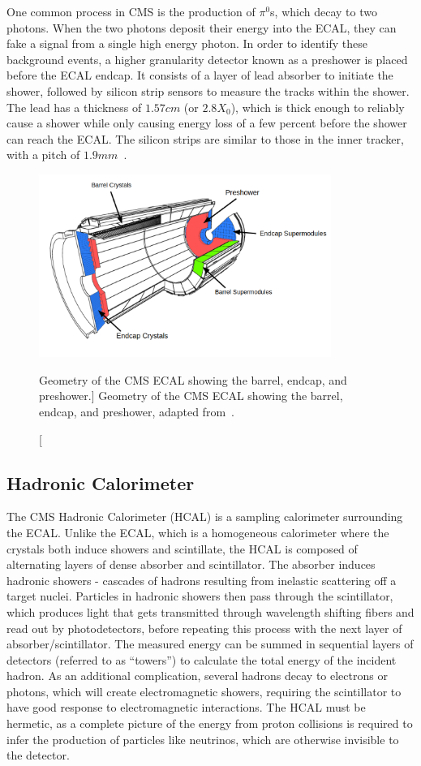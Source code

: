 One common process in CMS is the production of $\pi^0$s, which decay to two photons. When the two photons deposit their energy into the ECAL, they can fake a signal from a single high energy photon. In order to identify these background events, a higher granularity detector known as a preshower is placed before the ECAL endcap. It consists of a layer of lead absorber to initiate the shower, followed by silicon strip sensors to measure the tracks within the shower. The lead has a thickness of $1.57\unit{cm}$ (or $2.8X_0$), which is thick enough to reliably cause a shower while only causing energy loss of a few percent before the shower can reach the ECAL. The silicon strips are similar to those in the inner tracker, with a pitch of $1.9\unit{mm}$~\cite{TOURNEFIER2001355}.

\begin{figure}[htpb]
	\centering
	\includegraphics[width=0.85\textwidth]{figs/03_experiment/cms_ecal.pdf}
	\caption
	[Geometry of the CMS ECAL showing the barrel, endcap, and preshower.]
	{Geometry of the CMS ECAL showing the barrel, endcap, and preshower, adapted from~\cite{Marzocchi2019}.}
	\label{fig:ecal}
\end{figure}


\subsection{Hadronic Calorimeter} \label{sec:CMS_HCAL}
The CMS Hadronic Calorimeter (HCAL) is a sampling calorimeter surrounding the ECAL. Unlike the ECAL, which is a homogeneous calorimeter where the crystals both induce showers and scintillate, the HCAL is composed of alternating layers of dense absorber and scintillator. The absorber induces hadronic showers - cascades of hadrons resulting from inelastic scattering off a target nuclei. Particles in hadronic showers then pass through the scintillator, which produces light that gets transmitted through wavelength shifting fibers and read out by photodetectors, before repeating this process with the next layer of absorber/scintillator. The measured energy can be summed in sequential layers of detectors (referred to as ``towers'') to calculate the total energy of the incident hadron. As an additional complication, several hadrons decay to electrons or photons, which will create electromagnetic showers, requiring the scintillator to have good response to electromagnetic interactions. The HCAL must be hermetic, as a complete picture of the energy from proton collisions is required to infer the production of particles like neutrinos, which are otherwise invisible to the detector.

